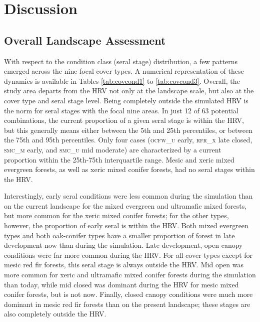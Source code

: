 
\chapter{Discussion}




\section{Overall Landscape Assessment}
With respect to the condition class (seral stage) distribution, a few patterns emerged across the nine focal cover types. A numerical representation of these dynamics is available in Tables \ref{tab:covcond1} to \ref{tab:covcond3}. Overall, the study area departs from the HRV not only at the landscape scale, but also at the cover type and seral stage level. Being completely outside the simulated HRV is the norm for seral stages with the focal nine areas. In just 12 of 63 potential combinations, the current proportion of a given seral stage is within the HRV, but this generally means either between the 5th and 25th percentiles, or between the 75th and 95th percentiles. Only four cases (\textsc{ocfw\_u} early, \textsc{rfr\_x} late closed, \textsc{smc\_m} early, and \textsc{smc\_u} mid moderate) are characterized by a current proportion within the 25th-75th interquartile range. Mesic and xeric mixed evergreen forests, as well as xeric mixed conifer forests, had no seral stages within the HRV.

Interestingly, early seral conditions were less common during the simulation than on the current landscape for the mixed evergreen and ultramafic mixed forests, but more common for the xeric mixed conifer forests; for the other types, however, the proportion of early seral is within the HRV. Both mixed evergreen types and both oak-conifer types have a smaller proportion of forest in late development now than during the simulation. Late development, open canopy conditions were far more common during the HRV. For all cover types except for mesic red fir forests, this seral stage is always outside the HRV. Mid open was more common for xeric and ultramafic mixed conifer forests during the simulation than today, while mid closed was dominant during the HRV for mesic mixed conifer forests, but is not now. Finally, closed canopy conditions were much more dominant in mesic red fir forests than on the present landscape; these stages are also completely outside the HRV.


